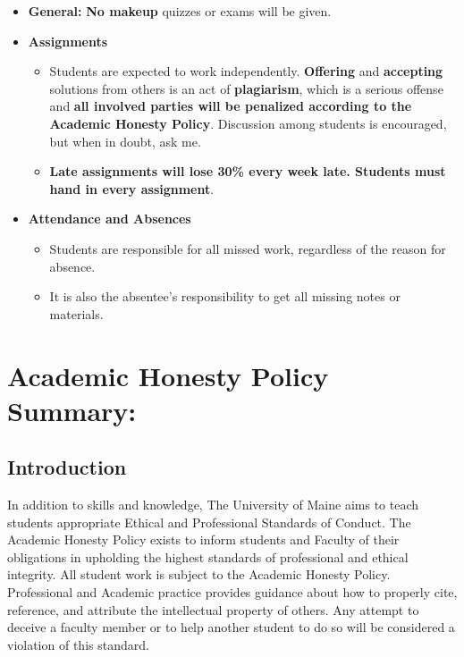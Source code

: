 \documentclass[11pt]{article}
\begin{document}
\begin{itemize}
\item \textbf {General:} \textbf {No makeup} quizzes or exams will be
  given.
\item \textbf {Assignments}
  \begin{itemize}
  \item Students are expected to work independently. \textbf{Offering}
    and \textbf{accepting} solutions from others is an act of
    \textbf{plagiarism}, which is a serious offense and \textbf{all
      involved parties will be penalized according to the Academic Honesty
      Policy}. Discussion among students is encouraged, but when in doubt,
    ask me.
  \item \textbf{Late assignments will lose 30\% every week late.
      Students must hand in every assignment}.
  \end{itemize}
\item \textbf{Attendance and Absences}
  \begin{itemize}
  \item Students are responsible for all missed work, regardless of
    the reason for absence.
  \item It is also the absentee's responsibility to get all missing
    notes or materials.
  \end{itemize}
\end{itemize}

\section*{Academic Honesty Policy Summary:}
\label{sec:honesty}

\subsection*{Introduction}
\label{sec:honesty-intro}

In addition to skills and knowledge, The University of Maine aims to
teach students appropriate Ethical and Professional Standards of
Conduct. The Academic Honesty Policy exists to inform students and
Faculty of their obligations in upholding the highest standards of
professional and ethical integrity. All student work is subject to the
Academic Honesty Policy. Professional and Academic practice provides
guidance about how to properly cite, reference, and attribute the
intellectual property of others. Any attempt to deceive a faculty
member or to help another student to do so will be considered a
violation of this standard.
\end{document}
